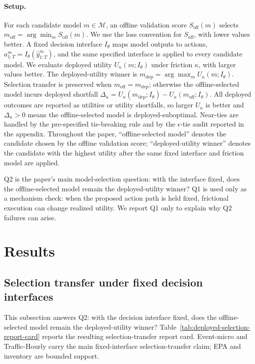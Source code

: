 \documentclass{article}
\begin{document}
\paragraph{Setup.}
For each candidate model \(m \in \mathcal{M}\), an offline validation score \(S_{\mathrm{off}}(m)\) selects \(m_{\mathrm{off}}=\arg\min_m S_{\mathrm{off}}(m)\). We use the loss convention for \(S_{\mathrm{off}}\), with lower values better. A fixed decision interface \(I_\theta\) maps model outputs to actions, \(a^m_{1:T}=I_\theta(\hat y^m_{1:T})\), and the same specified interface is applied to every candidate model. We evaluate deployed utility \(U_\kappa(m;I_\theta)\) under friction \(\kappa\), with larger values better. The deployed-utility winner is \(m_{\mathrm{dep}}=\arg\max_m U_\kappa(m;I_\theta)\). Selection transfer is preserved when \(m_{\mathrm{off}}=m_{\mathrm{dep}}\); otherwise the offline-selected model incurs deployed shortfall \(\Delta_\kappa=U_\kappa(m_{\mathrm{dep}};I_\theta)-U_\kappa(m_{\mathrm{off}};I_\theta)\). All deployed outcomes are reported as utilities or utility shortfalls, so larger \(U_\kappa\) is better and \(\Delta_\kappa>0\) means the offline-selected model is deployed-suboptimal. Near-ties are handled by the pre-specified tie-breaking rule and by the \(\epsilon\)-tie audit reported in the appendix. Throughout the paper, ``offline-selected model'' denotes the candidate chosen by the offline validation score; ``deployed-utility winner'' denotes the candidate with the highest utility after the same fixed interface and friction model are applied.

Q2 is the paper's main model-selection question: with the interface fixed, does the offline-selected model remain the deployed-utility winner? Q1 is used only as a mechanism check: when the proposed action path is held fixed, frictional execution can change realized utility. We report Q1 only to explain why Q2 failures can arise.

\section{Results}

\subsection{Selection transfer under fixed decision interfaces}

This subsection answers Q2: with the decision interface fixed, does the offline-selected model remain the deployed-utility winner? Table~\ref{tab:deployed-selection-report-card} reports the resulting selection-transfer report card. Event-micro and Traffic-Hourly carry the main fixed-interface selection-transfer claim; EPA and inventory are bounded support.
\end{document}
